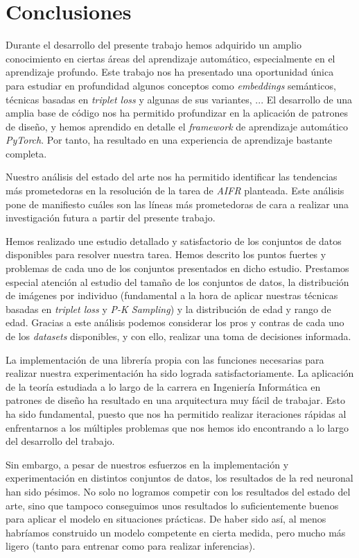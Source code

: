 \chapter{Conclusiones} \label{ich:conclusiones}

Durante el desarrollo del presente trabajo hemos adquirido un amplio conocimiento en ciertas áreas del aprendizaje automático, especialmente en el aprendizaje profundo. Este trabajo nos ha presentado una oportunidad única para estudiar en profundidad algunos conceptos como \textit{embeddings} semánticos, técnicas basadas en \textit{triplet loss} y algunas de sus variantes, ... El desarrollo de una amplia base de código nos ha permitido profundizar en la aplicación de patrones de diseño, y hemos aprendido en detalle el \textit{framework} de aprendizaje automático \textit{PyTorch}. Por tanto, ha resultado en una experiencia de aprendizaje bastante completa.

Nuestro análisis del estado del arte nos ha permitido identificar las tendencias más prometedoras en la resolución de la tarea de \textit{AIFR} planteada. Este análisis pone de manifiesto cuáles son las líneas más prometedoras de cara a realizar una investigación futura a partir del presente trabajo.

Hemos realizado une estudio detallado y satisfactorio  de los conjuntos de datos disponibles para resolver nuestra tarea. Hemos descrito los puntos fuertes y problemas de cada uno de los conjuntos presentados en dicho estudio. Prestamos especial atención al estudio del tamaño de los conjuntos de datos, la distribución de imágenes por individuo (fundamental a la hora de aplicar nuestras técnicas basadas en \textit{triplet loss} y \textit{P-K Sampling}) y la distribución de edad y rango de edad. Gracias a este análisis podemos considerar los pros y contras de cada uno de los \textit{datasets} disponibles, y con ello, realizar una toma de decisiones informada.

La implementación de una librería propia con las funciones necesarias para realizar nuestra experimentación ha sido lograda satisfactoriamente. La aplicación de la teoría estudiada a lo largo de la carrera en Ingeniería Informática en patrones de diseño ha resultado en una arquitectura muy fácil de trabajar. Esto ha sido fundamental, puesto que nos ha permitido realizar iteraciones rápidas al enfrentarnos a los múltiples problemas que nos hemos ido encontrando a lo largo del desarrollo del trabajo.

Sin embargo, a pesar de nuestros esfuerzos en la implementación y experimentación en distintos conjuntos de datos, los resultados de la red neuronal han sido pésimos. No solo no logramos competir con los resultados del estado del arte, sino que tampoco conseguimos unos resultados lo suficientemente buenos para aplicar el modelo en situaciones prácticas. De haber sido así, al menos habríamos construido un modelo competente en cierta medida, pero mucho más ligero (tanto para entrenar como para realizar inferencias).

